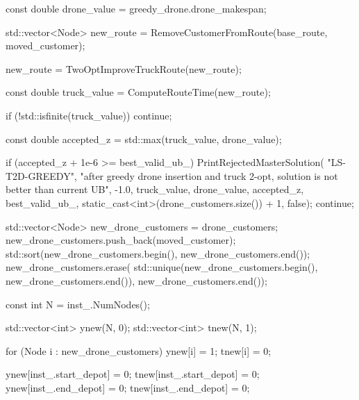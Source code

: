 {{{{{                    const double drone_value = greedy_drone.drone_makespan;

                    std::vector<Node> new_route =
                        RemoveCustomerFromRoute(base_route, moved_customer);

                    new_route = TwoOptImproveTruckRoute(new_route);

                    const double truck_value = ComputeRouteTime(new_route);

                    if (!std::isfinite(truck_value))
                    {
                        continue;
                    }

                    const double accepted_z = std::max(truck_value, drone_value);

                    if (accepted_z + 1e-6 >= best_valid_ub_)
                    {
                        PrintRejectedMasterSolution(
                            "LS-T2D-GREEDY",
                            "after greedy drone insertion and truck 2-opt, solution is not better than current UB",
                            -1.0,
                            truck_value,
                            drone_value,
                            accepted_z,
                            best_valid_ub_,
                            static_cast<int>(drone_customers.size()) + 1,
                            false);
                        continue;
                    }

                    std::vector<Node> new_drone_customers = drone_customers;
                    new_drone_customers.push_back(moved_customer);
                    std::sort(new_drone_customers.begin(), new_drone_customers.end());
                    new_drone_customers.erase(
                        std::unique(new_drone_customers.begin(), new_drone_customers.end()),
                        new_drone_customers.end());

                    const int N = inst_.NumNodes();

                    std::vector<int> ynew(N, 0);
                    std::vector<int> tnew(N, 1);

                    for (Node i : new_drone_customers)
                    {
                        ynew[i] = 1;
                        tnew[i] = 0;
                    }

                    ynew[inst_.start_depot] = 0;
                    tnew[inst_.start_depot] = 0;
                    ynew[inst_.end_depot] = 0;
                    tnew[inst_.end_depot] = 0;

}}}}}
